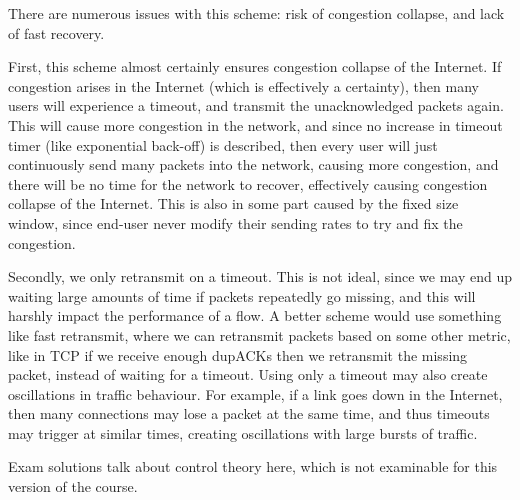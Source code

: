 
\usepackage{parskip}


There are numerous issues with this scheme: risk of congestion collapse, and lack of fast recovery.

First, this scheme almost certainly ensures congestion collapse of the Internet. If congestion arises in the Internet (which is effectively a certainty), then many users will experience a timeout, and transmit the unacknowledged packets again. This will cause more congestion in the network, and since no increase in timeout timer (like exponential back-off) is described, then every user will just continuously send many packets into the network, causing more congestion, and there will be no time for the network to recover, effectively causing congestion collapse of the Internet. This is also in some part caused by the fixed size window, since end-user never modify their sending rates to try and fix the congestion.

Secondly, we only retransmit on a timeout. This is not ideal, since we may end up waiting large amounts of time if packets repeatedly go missing, and this will harshly impact the performance of a flow. A better scheme would use something like fast retransmit, where we can retransmit packets based on some other metric, like in TCP if we receive enough dupACKs then we retransmit the missing packet, instead of waiting for a timeout. Using only a timeout may also create oscillations in traffic behaviour. For example, if a link goes down in the Internet, then many connections may lose a packet at the same time, and thus timeouts may trigger at similar times, creating oscillations with large bursts of traffic.

Exam solutions talk about control theory here, which is not examinable for this version of the course.



